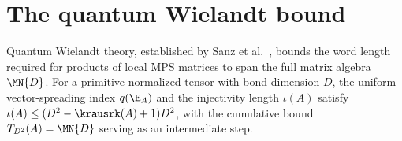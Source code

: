 \chapter{The quantum Wielandt bound}\label{ch:wielandt}

Quantum Wielandt theory, established by Sanz et al.~\cite{Sanz2010Quantum},
bounds the word length required for products of local MPS matrices to span the
full matrix algebra $\MN{D}$. For a primitive normalized tensor with bond
dimension $D$, the uniform vector-spreading index $q(\E_A)$ and the injectivity
length $\iota(A)$ satisfy $\iota(A)\le(D^2-\krausrk(A)+1)D^2$, with the cumulative
bound $T_{D^2}(A)=\MN{D}$ serving as an intermediate step.




